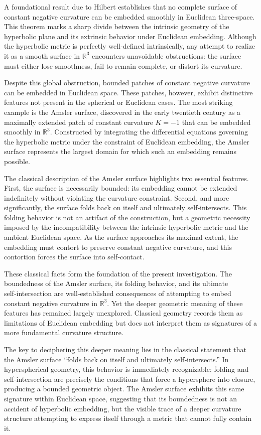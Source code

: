 \documentclass[final,onefignum,onetabnum]{siamart}
\begin{document}
A foundational result due to Hilbert establishes that no complete surface of constant negative curvature can be embedded smoothly in Euclidean three‑space. This theorem marks a sharp divide between the intrinsic geometry of the hyperbolic plane and its extrinsic behavior under Euclidean embedding. Although the hyperbolic metric is perfectly well‑defined intrinsically, any attempt to realize it as a smooth surface in $\mathbb{R}^3$ encounters unavoidable obstructions: the surface must either lose smoothness, fail to remain complete, or distort its curvature.

Despite this global obstruction, bounded patches of constant negative curvature can be embedded in Euclidean space. These patches, however, exhibit distinctive features not present in the spherical or Euclidean cases. The most striking example is the Amsler surface, discovered in the early twentieth century as a maximally extended patch of constant curvature $K = -1$ that can be embedded smoothly in $\mathbb{R}^3$. Constructed by integrating the differential equations governing the hyperbolic metric under the constraint of Euclidean embedding, the Amsler surface represents the largest domain for which such an embedding remains possible.

The classical description of the Amsler surface highlights two essential features. First, the surface is necessarily bounded: its embedding cannot be extended indefinitely without violating the curvature constraint. Second, and more significantly, the surface folds back on itself and ultimately self‑intersects. This folding behavior is not an artifact of the construction, but a geometric necessity imposed by the incompatibility between the intrinsic hyperbolic metric and the ambient Euclidean space. As the surface approaches its maximal extent, the embedding must contort to preserve constant negative curvature, and this contortion forces the surface into self‑contact.

These classical facts form the foundation of the present investigation. The boundedness of the Amsler surface, its folding behavior, and its ultimate self‑intersection are well‑established consequences of attempting to embed constant negative curvature in $\mathbb{R}^3$. Yet the deeper geometric meaning of these features has remained largely unexplored. Classical geometry records them as limitations of Euclidean embedding but does not interpret them as signatures of a more fundamental curvature structure.

The key to deciphering this deeper meaning lies in the classical statement that the Amsler surface “folds back on itself and ultimately self‑intersects.” In hyperspherical geometry, this behavior is immediately recognizable: folding and self‑intersection are precisely the conditions that force a hypersphere into closure, producing a bounded geometric object. The Amsler surface exhibits this same signature within Euclidean space, suggesting that its boundedness is not an accident of hyperbolic embedding, but the visible trace of a deeper curvature structure attempting to express itself through a metric that cannot fully contain it.
\end{document}
